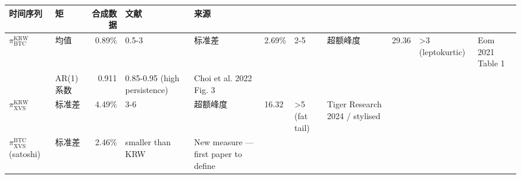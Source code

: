 \begin{tabular}{llrll}
\toprule
时间序列 & 矩 & 合成数据 & 文献 & 来源 \\
\midrule
$\pi^{\text{KRW}}_{\text{BTC}}$ & 均值 & 0.89\% & 0.5-3%
 & 标准差 & 2.69\% & 2-5%
 & 超额峰度 & 29.36 & >3 (leptokurtic) & Eom 2021 Table 1 \\
 & AR(1)系数 & 0.911 & 0.85-0.95 (high persistence) & Choi et al. 2022 Fig. 3 \\
\midrule
$\pi^{\text{KRW}}_{\text{XVS}}$ & 标准差 & 4.49\% & 3-6%
 & 超额峰度 & 16.32 & >5 (fat tail) & Tiger Research 2024 / stylised \\
\midrule
$\pi^{\text{BTC}}_{\text{XVS}}$ (satoshi) & 标准差 & 2.46\% & smaller than KRW & New measure — first paper to define \\
\bottomrule
\end{tabular}